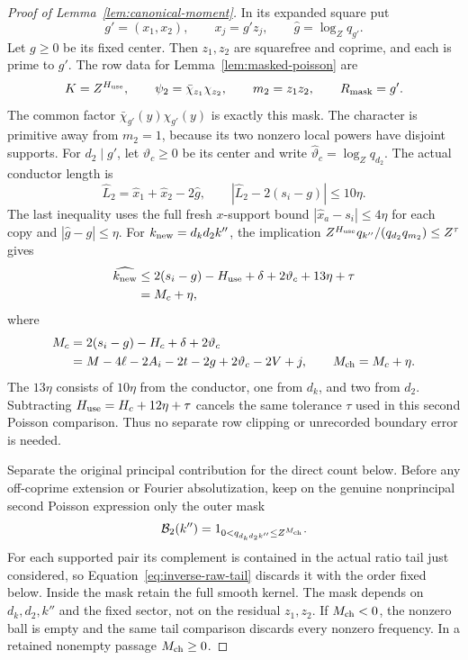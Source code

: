 \documentclass[12pt]{article}
\begin{document}
\begin{proof}[Proof of Lemma~\ref{lem:canonical-moment}]
In its expanded square put
\[
 g'=(x_1,x_2),\qquad x_j=g'z_j,\qquad
 \widehat g=\log_Zq_{g'}.
\]
Let \(g\ge0\) be its fixed center.
Then \(z_1,z_2\) are squarefree and coprime, and each is prime to
\(g'\).  The row data for Lemma~\ref{lem:masked-poisson} are
\begin{equation}\label{eq:second-masked-data}
 K=Z^{H_{\rm use}},\qquad
 \psi_2=\bar\chi_{z_1}\chi_{z_2},\qquad
 m_2=z_1z_2,\qquad R_{\rm mask}=g'.
\end{equation}
The common factor \(\bar\chi_{g'}(y)\chi_{g'}(y)\) is exactly this
mask.  The character is primitive away from \(m_2=1\), because its
two nonzero local powers have disjoint supports.  For \(d_2\mid g'\),
let \(\vartheta_c\ge0\) be its center and write
\(\widehat\vartheta_c=\log_Zq_{d_2}\).  The actual conductor length is
\[
 \widehat L_2=\widehat x_1+\widehat x_2-2\widehat g,
 \qquad |\widehat L_2-2(s_i-g)|\le10\eta.
\]
The last inequality uses the full fresh \(x\)-support bound
\(|\widehat x_a-s_i|\le4\eta\) for each copy and
\(|\widehat g-g|\le\eta\).  For \(k_{\rm new}=d_kd_2k''\), the implication
\(Z^{H_{\rm use}}q_{k''}/(q_{d_2}q_{m_2})\le Z^\tau\) gives
\[
 \begin{split}
 \widehat{k_{\rm new}}
 &\le2(s_i-g)-H_{\rm use}+\delta+2\vartheta_c+13\eta+\tau\\
 &=M_c+\eta,
 \end{split}
\]
where
\begin{equation}\label{eq:second-poisson-lengths}
 \begin{split}
 M_c&=2(s_i-g)-H_c+\delta+2\vartheta_c\\
    &=M-4\ell-2A_i-2t-2g+2\vartheta_c-2V+j,\qquad
 M_{\rm ch}=M_c+\eta.
 \end{split}
\end{equation}
The \(13\eta\) consists of \(10\eta\) from the conductor, one from
\(d_k\), and two from \(d_2\).  Subtracting
\(H_{\rm use}=H_c+12\eta+\tau\) cancels the same tolerance \(\tau\)
used in this second Poisson comparison.  Thus no separate row clipping
or unrecorded boundary error is needed.

Separate the original principal contribution for the direct count below.
Before any off-coprime extension or Fourier absolutization, keep on the
genuine nonprincipal second Poisson expression only the outer mask
\[
 \mathcal B_2(k'')=1_{0<q_{d_kd_2k''}\le Z^{M_{\rm ch}}}.
\]
For each supported pair its complement is contained in the actual ratio
tail just considered, so Equation~\eqref{eq:inverse-raw-tail} discards it
with the order fixed below.  Inside the mask retain the full smooth kernel.
The mask depends on \(d_k,d_2,k''\) and the fixed sector, not on the residual
\(z_1,z_2\).  If \(M_{\rm ch}<0\), the nonzero ball is empty and the same
tail comparison discards every nonzero frequency.  In a retained nonempty
passage \(M_{\rm ch}\ge0\).


\end{proof}
\end{document}
